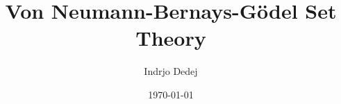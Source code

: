 




\title{Von Neumann-Bernays-G\"odel Set Theory}
\author{Indrjo Dedej}
\date{\today}



\maketitle

{\small\tableofcontents}







